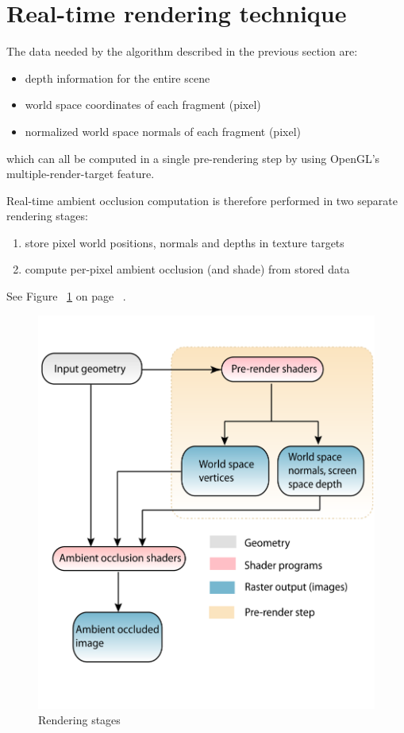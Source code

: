 \documentclass{article}
\begin{document}
\section{Real-time rendering technique} 

The data needed by the algorithm described in the previous section are:

\begin{itemize}
	\item depth information for the entire scene
	\item world space coordinates of each fragment (pixel)
	\item normalized world space normals of each fragment (pixel) 
\end{itemize}

which can all be computed in a single pre-rendering step by using OpenGL's multiple-render-target feature.

Real-time ambient occlusion computation is therefore performed in two separate rendering stages:

\begin{enumerate}
	\item store pixel world positions, normals and depths in texture targets
	\item compute per-pixel ambient occlusion (and shade) from stored data 
\end{enumerate}

See Figure ~\ref{ssaoadiagram} on page ~\pageref{ssaoadiagram}.

\begin{figure}[!ht]
\caption{Rendering stages}
\begin{center}
\includegraphics{images/SSAO-diagram.png}
\end{center}
\label{ssaoadiagram}
\end{figure}
\end{document}
